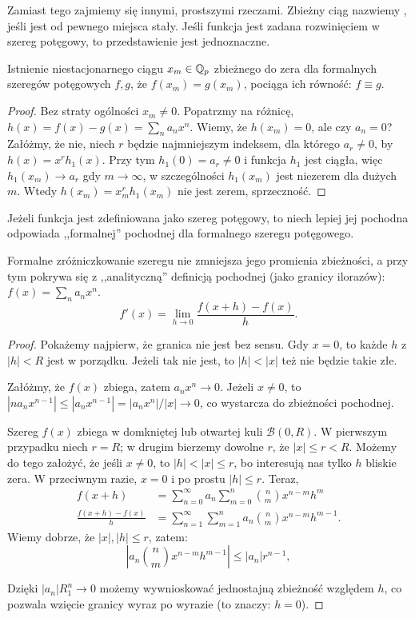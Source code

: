 Zamiast tego zajmiemy się innymi, prostszymi rzeczami.
Zbieżny ciąg nazwiemy , jeśli jest od pewnego miejsca stały.
Jeśli funkcja jest zadana rozwinięciem w szereg potęgowy, to przedstawienie jest jednoznaczne.

\begin{fakt} \label{fratris}
	Istnienie niestacjonarnego ciągu $x_m \in \mathbb Q_p$ zbieżnego do zera dla formalnych szeregów potęgowych $f, g$, że $f(x_m) = g(x_m)$, pociąga ich równość: $f \equiv g$.
\end{fakt}

\begin{proof}
	Bez straty ogólności $x_m \neq 0$.
	Popatrzmy na różnicę, $h(x) = f(x) - g(x) = \sum_n a_nx^n$.
	Wiemy, że $h(x_m) = 0$, ale czy $a_n = 0$?
	Załóżmy, że nie, niech $r$ będzie najmniejszym indeksem, dla którego $a_r \neq 0$, by
	$h(x) = x^r h_1(x)$.
	Przy tym $h_1(0) = a_r \neq 0$ i funkcja $h_1$ jest ciągła, więc $h_1(x_m) \to a_r$ gdy $m \to \infty$, w szczególności $h_1(x_m)$ jest niezerem dla dużych $m$.
Wtedy $h(x_m) = x_m^r h_1(x_m)$ nie jest zerem, sprzeczność.
\end{proof}

Jeżeli funkcja jest zdefiniowana jako szereg potęgowy, to niech lepiej jej pochodna odpowiada ,,formalnej'' pochodnej dla formalnego szeregu potęgowego.

\begin{fakt} \label{maris}
	Formalne zróżniczkowanie szeregu nie zmniejsza jego promienia zbieżności, a przy tym pokrywa się z ,,analityczną'' definicją pochodnej (jako granicy ilorazów): $f(x) = \sum_n a_nx^n$.
	\[
		f'(x) = \lim_{h \to 0} \frac {f(x+h)-f(x)}h.
	\]
\end{fakt}

\begin{proof}
	Pokażemy najpierw, że granica nie jest bez sensu.
	Gdy $x = 0$, to każde $h$ z $|h| < R $ jest w porządku. 
	Jeżeli tak nie jest, to $|h| < |x|$ też nie będzie takie złe.

	Załóżmy, że $f(x)$ zbiega, zatem $a_n x^n \to 0$.
	Jeżeli $x \neq 0$, to $|na_nx^{n-1}| \le |a_nx^{n-1}| = |a_nx^n|/|x| \to 0$, co wystarcza do zbieżności pochodnej.

	Szereg $f(x)$ zbiega w domkniętej lub otwartej kuli $\mathcal B(0, R )$.
	W pierwszym przypadku niech $r = R $; w drugim bierzemy dowolne $r$, że $|x| \le r < R $.
	Możemy do tego założyć, że jeśli $x \neq 0$, to $|h| < |x| \le r$, bo interesują nas tylko $h$ bliskie zera.
	W przeciwnym razie, $x = 0$ i po prostu $|h| \le r$.
	Teraz,
	\begin{align*}
		f(x+h)                  & = \sum_{n = 0}^\infty a_n \sum_{m = 0}^n {n \choose m} x^{n-m} h^m \\
		\frac{f(x+h) - f(x)}{h} & = \sum_{n = 1}^\infty \sum_{m = 1}^n a_n {n \choose m} x^{n-m} h^{m-1}.
		\end{align*}
	Wiemy dobrze, że $|x|, |h| \le r$, zatem:
	\[
		\left| a_n {n \choose m} x^{n-m} h^{m-1} \right| \le |a_n| r^{n-1},
	\]

	Dzięki $|a_n|R _1^n \to 0$ możemy wywnioskować jednostajną zbieżność względem $h$, co pozwala wzięcie granicy wyraz po wyrazie (to znaczy: $h = 0$).
\end{proof}

